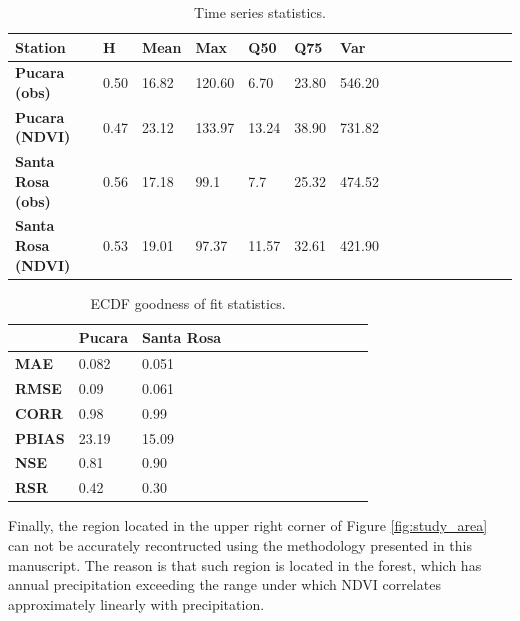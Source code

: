 \documentclass[10pt,letterpaper,conference]{ieeeconf}
\begin{document}
\begin{table}[ht] 
\caption{Time series statistics.}
\vspace*{-0.15in}
\label{table:PucStaRosaTimeseriestable}
\vskip4mm
\centering
\begin{tabularx}{\columnwidth}{@{}>{\bfseries}l*{15}{X}@{}}
\hline \hline
 Station	&  H & Mean & Max & Q50 &  Q75 & Var  \\
\hline \hline
Pucara (obs)& 0.50&	16.82&	120.60&	6.70&	23.80&	546.20\\
Pucara (NDVI)& 0.47&	23.12&	133.97&	13.24&	38.90&	731.82\\
\hline
Santa Rosa (obs)&  0.56 & 17.18&  99.1&	 7.7&	25.32& 474.52\\%
Santa Rosa (NDVI)&  0.53& 19.01&  97.37& 11.57&	32.61&	421.90\\
\hline
\end{tabularx}
\end{table}



\begin{table}[ht] 
\caption{ECDF goodness of fit statistics.}
\vspace*{-0.15in}
\label{table:PucStaRosaTimeseriesGoF}
\vskip4mm
\centering
\begin{tabularx}{4.5cm}{@{}>{\bfseries}l*{12}{X}@{}}
\hline \hline
 & Pucara & Santa Rosa   \\
\hline \hline
MAE &  0.082   &  0.051 \\ 
\hline
RMSE &  0.09   &  0.061\\
\hline
CORR & 	0.98   &  0.99 \\
\hline
PBIAS & 23.19  & 15.09\\
\hline
NSE &  0.81    & 0.90\\
\hline
RSR & 	0.42   & 0.30\\
\hline
\end{tabularx}
\end{table}



Finally, the region located in the upper right corner of Figure 
\ref{fig:study_area} can not be accurately recontructed using the methodology 
presented in this manuscript. The reason is that such region is located in the 
forest, which has annual precipitation exceeding the range under which NDVI 
correlates approximately  linearly with precipitation. 
\end{document}

